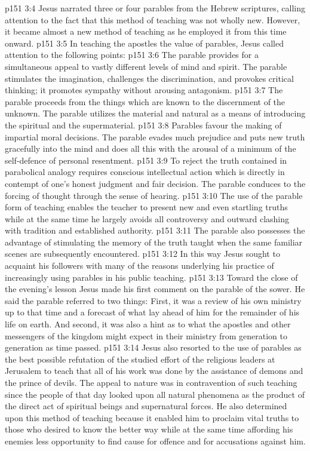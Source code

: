 \vs p151 3:4 \bibnobreakspace Jesus narrated three or four parables from the Hebrew scriptures, calling attention to the fact that this method of teaching was not wholly new. However, it became almost a new method of teaching as he employed it from this time onward.
\vs p151 3:5 \bibnobreakspace In teaching the apostles the value of parables, Jesus called attention to the following points:
\vs p151 3:6 The parable provides for a simultaneous appeal to vastly different levels of mind and spirit. The parable stimulates the imagination, challenges the discrimination, and provokes critical thinking; it promotes sympathy without arousing antagonism.
\vs p151 3:7 The parable proceeds from the things which are known to the discernment of the unknown. The parable utilizes the material and natural as a means of introducing the spiritual and the supermaterial.
\vs p151 3:8 Parables favour the making of impartial moral decisions. The parable evades much prejudice and puts new truth gracefully into the mind and does all this with the arousal of a minimum of the self\hyp{}defence of personal resentment.
\vs p151 3:9 To reject the truth contained in parabolical analogy requires conscious intellectual action which is directly in contempt of one’s honest judgment and fair decision. The parable conduces to the forcing of thought through the sense of hearing.
\vs p151 3:10 The use of the parable form of teaching enables the teacher to present new and even startling truths while at the same time he largely avoids all controversy and outward clashing with tradition and established authority.
\vs p151 3:11 The parable also possesses the advantage of stimulating the memory of the truth taught when the same familiar scenes are subsequently encountered.
\vs p151 3:12 \pc In this way Jesus sought to acquaint his followers with many of the reasons underlying his practice of increasingly using parables in his public teaching.
\vs p151 3:13 \pc Toward the close of the evening’s lesson Jesus made his first comment on the parable of the sower. He said the parable referred to two things: First, it was a review of his own ministry up to that time and a forecast of what lay ahead of him for the remainder of his life on earth. And second, it was also a hint as to what the apostles and other messengers of the kingdom might expect in their ministry from generation to generation as time passed.
\vs p151 3:14 Jesus also resorted to the use of parables as the best possible refutation of the studied effort of the religious leaders at Jerusalem to teach that all of his work was done by the assistance of demons and the prince of devils. The appeal to nature was in contravention of such teaching since the people of that day looked upon all natural phenomena as the product of the direct act of spiritual beings and supernatural forces. He also determined upon this method of teaching because it enabled him to proclaim vital truths to those who desired to know the better way while at the same time affording his enemies less opportunity to find cause for offence and for accusations against him.
